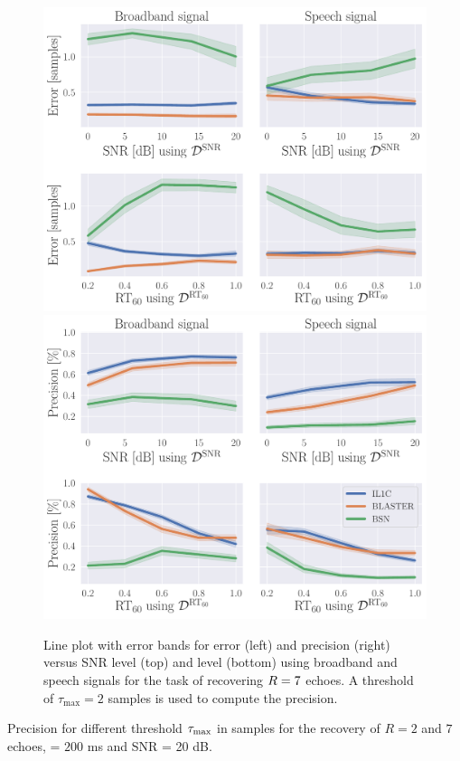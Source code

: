 \begin{figure}[ht]
    \centering
    \begin{fullwidth}
        \includegraphics[width=.49\textwidth]{figures/blaster/e_k-7_thr-2_bns_crocco_blaster.pdf}
        \includegraphics[width=.49\textwidth]{figures/blaster/p_k-7_thr-2_bns_crocco_blaster.pdf}

        \caption{%
            \label{fig:error_precision_snr_rt}
            Line plot with error bands for error (left) and precision (right) versus SNR level (top) and \RT{} level (bottom) using broadband and speech signals for the task of recovering $R=7$ echoes. A threshold of $\tau_{\textrm{max}}=2$ samples is used to compute the precision.
        }

    \end{fullwidth}
\end{figure}

\begin{table}[ht]
    \centering
    \small
    
    \caption{\label{tab:error_precision_thr} Precision for different threshold $\tau_\text{max}$ in samples for the recovery of $R = 2$ and $7$ echoes, \RT{} = $200$ ms and SNR = 20 dB.}
\end{table}

